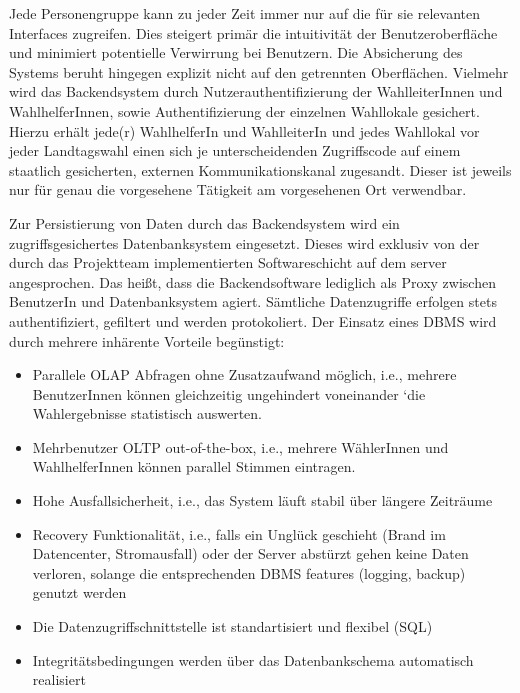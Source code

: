 \documentclass[a4paper,12pt]{article}
\begin{document}
Jede Personengruppe kann zu jeder Zeit immer nur auf die für sie relevanten Interfaces zugreifen.
Dies steigert primär die intuitivität der Benutzeroberfläche und minimiert potentielle Verwirrung
bei Benutzern. Die Absicherung des Systems beruht hingegen explizit nicht auf den getrennten 
Oberflächen. Vielmehr wird das Backendsystem durch Nutzerauthentifizierung der WahlleiterInnen und 
WahlhelferInnen, sowie Authentifizierung der einzelnen Wahllokale gesichert. Hierzu erhält jede(r)
WahlhelferIn und WahlleiterIn und jedes Wahllokal vor jeder Landtagswahl einen sich je unterscheidenden 
Zugriffscode auf einem staatlich gesicherten, externen Kommunikationskanal zugesandt. Dieser
ist jeweils nur für genau die vorgesehene Tätigkeit am vorgesehenen Ort verwendbar.

Zur Persistierung von Daten durch das Backendsystem wird ein zugriffsgesichertes Datenbanksystem eingesetzt. Dieses
wird exklusiv von der durch das Projektteam implementierten Softwareschicht auf dem server angesprochen.
Das heißt, dass die Backendsoftware lediglich als Proxy zwischen BenutzerIn und Datenbanksystem agiert. Sämtliche 
Datenzugriffe erfolgen stets authentifiziert, gefiltert und werden protokoliert. 
%
Der Einsatz eines DBMS wird durch mehrere inhärente Vorteile begünstigt:

\begin{itemize}
      \item Parallele OLAP Abfragen ohne Zusatzaufwand möglich, i.e., mehrere BenutzerInnen können 
            gleichzeitig ungehindert voneinander `die Wahlergebnisse statistisch auswerten.
      \item Mehrbenutzer OLTP out-of-the-box, i.e., mehrere WählerInnen und WahlhelferInnen können parallel Stimmen
            eintragen.
      \item Hohe Ausfallsicherheit, i.e., das System läuft stabil über längere Zeiträume
      \item Recovery Funktionalität, i.e., falls ein Unglück geschieht (Brand im Datencenter, Stromausfall) 
            oder der Server abstürzt gehen keine Daten verloren, solange die entsprechenden DBMS features 
            (logging, backup) genutzt werden
      \item Die Datenzugriffschnittstelle ist standartisiert und flexibel (SQL)
      \item Integritätsbedingungen werden über das Datenbankschema automatisch realisiert
\end{itemize}
\end{document}
